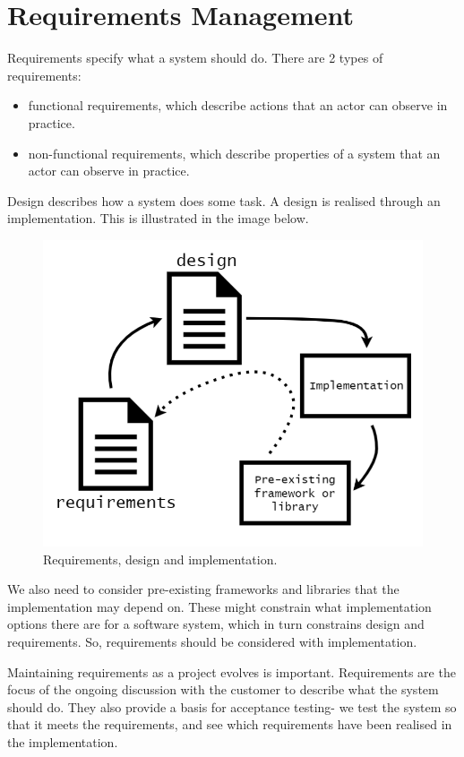 \documentclass[a4paper, openany]{memoir}
\begin{document}
\chapter{Requirements Management}
Requirements specify what a system should do. There are 2 types of requirements:
\begin{itemize}
    \item functional requirements, which describe actions that an actor can observe in practice.
    
    \item non-functional requirements, which describe properties of a system that an actor can observe in practice.
\end{itemize}
Design describes how a system does some task. A design is realised through an implementation. This is illustrated in the image below.
\begin{figure}[H]
    \centering
    \includegraphics[scale=0.4]{src/requirements v design.PNG}
    \caption{Requirements, design and implementation.}
\end{figure}
\noindent We also need to consider pre-existing frameworks and libraries that the implementation may depend on. These might constrain what implementation options there are for a software system, which in turn constrains design and requirements. So, requirements should be considered with implementation.

Maintaining requirements as a project evolves is important. Requirements are the focus of the ongoing discussion with the customer to describe what the system should do. They also provide a basis for acceptance testing- we test the system so that it meets the requirements, and see which requirements have been realised in the implementation.
\end{document}
